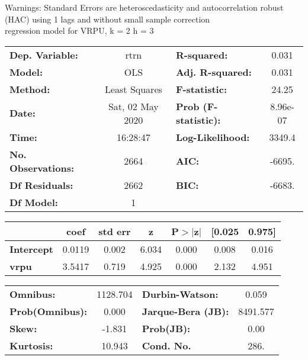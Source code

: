 Warnings: \newline
 [1] Standard Errors are heteroscedasticity and autocorrelation robust (HAC) using 1 lags and without small sample correction\\ 

regression model for VRPU, k = 2 h = 3\begin{center}
\begin{tabular}{lclc}
\toprule
\textbf{Dep. Variable:}    &       rtrn       & \textbf{  R-squared:         } &     0.031   \\
\textbf{Model:}            &       OLS        & \textbf{  Adj. R-squared:    } &     0.031   \\
\textbf{Method:}           &  Least Squares   & \textbf{  F-statistic:       } &     24.25   \\
\textbf{Date:}             & Sat, 02 May 2020 & \textbf{  Prob (F-statistic):} &  8.96e-07   \\
\textbf{Time:}             &     16:28:47     & \textbf{  Log-Likelihood:    } &    3349.4   \\
\textbf{No. Observations:} &        2664      & \textbf{  AIC:               } &    -6695.   \\
\textbf{Df Residuals:}     &        2662      & \textbf{  BIC:               } &    -6683.   \\
\textbf{Df Model:}         &           1      & \textbf{                     } &             \\
\bottomrule
\end{tabular}
\begin{tabular}{lcccccc}
                   & \textbf{coef} & \textbf{std err} & \textbf{z} & \textbf{P$> |$z$|$} & \textbf{[0.025} & \textbf{0.975]}  \\
\midrule
\textbf{Intercept} &       0.0119  &        0.002     &     6.034  &         0.000        &        0.008    &        0.016     \\
\textbf{vrpu}      &       3.5417  &        0.719     &     4.925  &         0.000        &        2.132    &        4.951     \\
\bottomrule
\end{tabular}
\begin{tabular}{lclc}
\textbf{Omnibus:}       & 1128.704 & \textbf{  Durbin-Watson:     } &    0.059  \\
\textbf{Prob(Omnibus):} &   0.000  & \textbf{  Jarque-Bera (JB):  } & 8491.577  \\
\textbf{Skew:}          &  -1.831  & \textbf{  Prob(JB):          } &     0.00  \\
\textbf{Kurtosis:}      &  10.943  & \textbf{  Cond. No.          } &     286.  \\
\bottomrule
\end{tabular}
\end{center}

